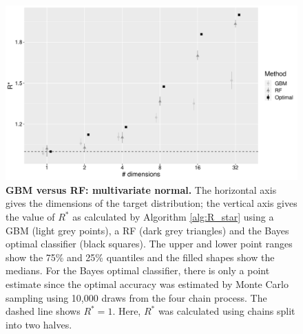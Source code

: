 \documentclass[ba]{imsart}
\numberwithin{equation}{section}
\theoremstyle{plain}
\begin{document}
\begin{supplement}
		\begin{figure}[!htb]
			\centerline{\includegraphics[width=1\textwidth]{gbm_vs_rf_normal.pdf}}
			\caption{\textbf{GBM versus RF: multivariate normal.} The horizontal axis gives the dimensions of the target distribution; the vertical axis gives the value of $R^*$ as calculated by Algorithm \ref{alg:R_star} using a GBM (light grey points), a RF (dark grey triangles) and the Bayes optimal classifier (black squares). The upper and lower point ranges show the 75\% and 25\% quantiles and the filled shapes show the medians. For the Bayes optimal classifier, there is only a point estimate since the optimal accuracy was estimated by Monte Carlo sampling using 10,000 draws from the four chain process. The dashed line shows $R^*=1$. Here, $R^*$ was calculated using chains split into two halves.}
			\label{fig:gbm_vs_rf_normal}
		\end{figure}
		

\end{supplement}
\end{document}
